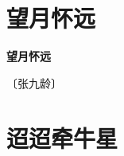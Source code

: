 \documentclass[12pt,UTF-8,openany,fontset=none]{ctexbook}
\begin{document}
\vspace{8pt}
\clearpage

\section{望月怀远}



\begin{center}
    {\bfseries 望月怀远}
\end{center}

\begin{center}
    \vspace{10pt}
    
    \begin{large}
        
        〔张九龄〕
        
    \end{large}
    
    \vspace{8pt}
    
    \begin{huge}
        
        \phantom{。}

        \phantom{。}
        
        \phantom{。}

        \phantom{。}
        
        \phantom{。}

        \phantom{。}
        
        \phantom{。}

        \phantom{。}
        
    \end{huge}
    
\end{center}

\vspace{8pt}
\clearpage

\section{迢迢牵牛星}

\end{document}
